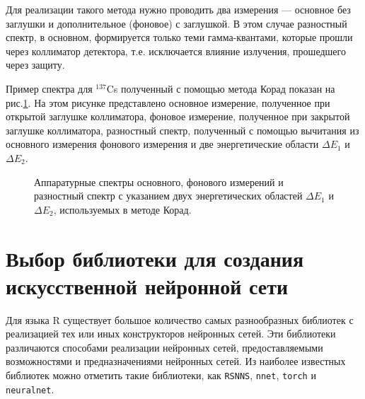 \documentclass[12pt]{article}
\begin{document}
Для реализации такого метода нужно проводить два измерения --- основное без заглушки и дополнительное (фоновое) с заглушкой. В этом случае разностный спектр, в основном, формируется только теми гамма-квантами, которые прошли через коллиматор детектора, т.е. исключается влияние излучения, прошедшего через защиту.

Пример спектра для ${}^{137}$Cs полученный с помощью метода Корад показан на рис.\ref{fig:spectrum}. На этом рисунке представлено основное измерение, полученное при открытой заглушке коллиматора, фоновое измерение, полученное при закрытой заглушке коллиматора, разностный спектр, полученный с помощью вычитания из основного измерения фонового измерения и две энергетические области $\Delta E_1$ и $\Delta E_2$.

\begin{figure}[h]
\caption{Аппаратурные спектры основного, фонового измерений и разностный спектр с указанием двух энергетических областей $\Delta E_1$ и $\Delta E_2$, используемых в методе Корад.}
\label{fig:spectrum}
\end{figure}

\section{Выбор библиотеки для создания искусственной нейронной сети}

  Для языка R существует большое количество самых разнообразных библиотек с реализацией тех или иных конструкторов нейронных сетей. Эти библиотеки различаются способами реализации нейронных сетей, предоставляемыми возможностями и предназначениями нейронных сетей. Из наиболее известных библиотек можно отметить такие библиотеки, как \verb|RSNNS|, \verb|nnet|, \verb|torch| и \verb|neuralnet|.
\end{document}
